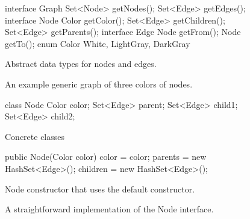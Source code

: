 \begin{figure}
\centering
{}
\qquad
\begin{subfloat}
\label{fig:graph-interfaces}
\begin{minipage}[b]{0.45\textwidth}
\begin{figurelisting}
interface Graph {
	Set<Node> getNodes();
	Set<Edge> getEdges();
}
interface Node {
	Color getColor();
	Set<Edge> getChildren();
	Set<Edge> getParents();
}
interface Edge {
	Node getFrom();
	Node getTo();
}
enum Color {
	White, LightGray, DarkGray
}
\end{figurelisting}
\end{minipage}
\caption{Abstract data types for nodes and edges.}
\end{subfloat}
	\caption{An example generic graph of three colors of nodes.}
	\label{fig:exampleGraph}
\end{figure}

\begin{figure}
\centering
\begin{subfloat}
\begin{minipage}[b]{0.3\textwidth}
\begin{figurelisting}
class Node {
   Color color;
   Set<Edge> parent;
   Set<Edge> child1;
   Set<Edge> child2;
}
\end{figurelisting}
\end{minipage}
\caption{Concrete classes}
\end{subfloat}
\quad
\begin{subfloat}
\begin{minipage}[b]{0.5\textwidth}
\begin{figurelisting}
public Node(Color color) {
   color = color;
   parents = new HashSet<Edge>();
   children = new HashSet<Edge>();
}
\end{figurelisting}
\end{minipage}
\caption{Node constructor that uses the default  constructor.}
\label{fig:node-obvious-constructor}
\end{subfloat}
\caption{A straightforward implementation of the Node interface.}
\label{fig:node-obvious-impl}
\end{figure}

